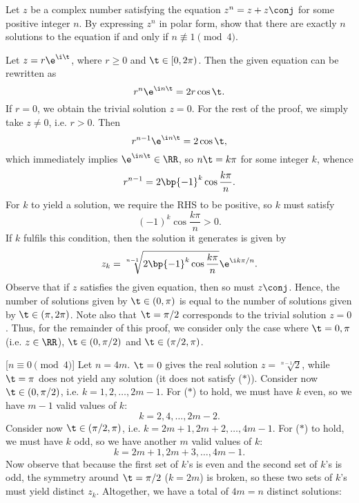 \begin{problem}
    Let $z$ be a complex number satisfying the equation $z^n = z + z\conj$ for some positive integer $n$. By expressing $z^n$ in polar form, show that there are exactly $n$ solutions to the equation if and only if $n \not\equiv 1 \pmod{4}$.
\end{problem}
\begin{solution}
    Let $z = r\e^{\i \t}$, where $r \geq 0$ and $\t \in [0, 2\pi)$. Then the given equation can be rewritten as \[r^n \e^{\i n \t} = 2 r \cos \t.\] If $r = 0$, we obtain the trivial solution $z = 0$. For the rest of the proof, we simply take $z \neq 0$, i.e. $r > 0$. Then \[r^{n-1} \e^{\i n \t} = 2 \cos \t,\] which immediately implies $\e^{\i n \t} \in \RR$, so $n \t = k \pi$ for some integer $k$, whence \[r^{n-1} = 2 \bp{-1}^k \cos \frac{k \pi}{n}.\] For $k$ to yield a solution, we require the RHS to be positive, so $k$ must satisfy \[(-1)^k \cos \frac{k \pi}{n} > 0. \tag{$\ast$}\] If $k$ fulfils this condition, then the solution it generates is given by \[z_k = \sqrt[n-1]{2 \bp{-1}^k \cos \frac{k\pi}{n}} \e^{\i k \pi / n}.\] Observe that if $z$ satisfies the given equation, then so must $z\conj$. Hence, the number of solutions given by $\t \in (0, \pi)$ is equal to the number of solutions given by $\t \in (\pi, 2\pi)$. Note also that $\t = \pi/2$ corresponds to the trivial solution $z = 0$. Thus, for the remainder of this proof, we consider only the case where $\t = 0, \pi$ (i.e. $z \in \RR$), $\t \in (0, \pi/2)$ and $\t \in (\pi/2, \pi)$.

    [$n \equiv 0 \pmod{4}$] Let $n = 4m$. $\t = 0$ gives the real solution $z = \sqrt[n-1]{2}$, while $\t = \pi$ does not yield any solution (it does not satisfy ($\ast$)). Consider now $\t \in (0, \pi/2)$, i.e. $k = 1, 2, \dots, 2m-1$. For ($\ast$) to hold, we must have $k$ even, so we have $m-1$ valid values of $k$: \[k = 2, 4, \dots, 2m-2.\] Consider now $\t \in (\pi/2, \pi)$, i.e. $k = 2m + 1, 2m+2, \dots, 4m-1$. For ($\ast$) to hold, we must have $k$ odd, so we have another $m$ valid values of $k$: \[k = 2m+1, 2m+3, \dots, 4m-1.\] Now observe that because the first set of $k$'s is even and the second set of $k$'s is odd, the symmetry around $\t = \pi/2$ ($k = 2m$) is broken, so these two sets of $k$'s must yield distinct $z_k$. Altogether, we have a total of $4m = n$ distinct solutions:


\end{solution}
